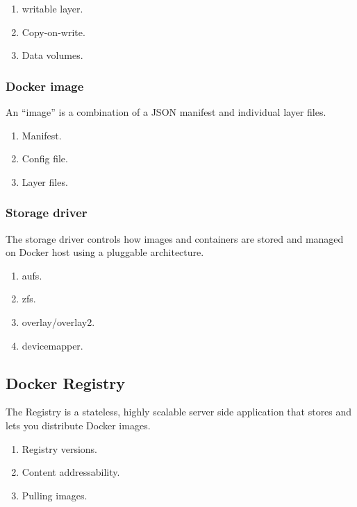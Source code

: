  \begin{enumerate}
 	\item writable layer.
 	\item Copy-on-write.
 	\item Data volumes.
 \end{enumerate}
 
\subsubsection{Docker image}

An “image” is a combination of a JSON manifest and individual layer files. 

\begin{enumerate}
	\item Manifest.
	\item Config file.
	\item Layer files.
\end{enumerate}

\subsubsection{Storage driver}

 The storage driver controls how images and containers are stored and managed on Docker host using a pluggable architecture. 

\begin{enumerate}
	\item aufs.
	\item zfs.
	\item overlay/overlay2.
	\item devicemapper.
\end{enumerate}




\subsection{Docker Registry}

The Registry is a stateless, highly scalable server side application that stores and lets you distribute Docker images.

\begin{enumerate}
	\item Registry versions.
	\item Content addressability.
	\item Pulling images.
\end{enumerate}

